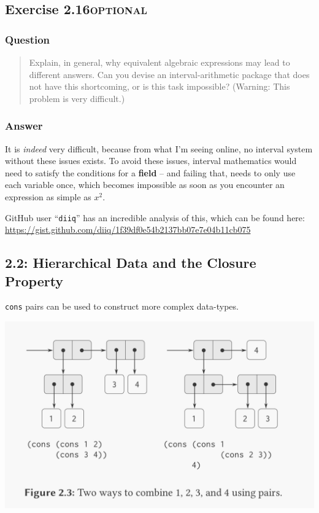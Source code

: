 \documentclass[final,fleqn,titlepage,twoside]{article}
\begin{document}
\subsection{Exercise 2.16\hfill{}\textsc{optional}}
\label{sec:org191cd6a}
\subsubsection{Question}
\label{sec:org5093162}
\begin{quote}
Explain, in general, why equivalent algebraic expressions may lead to different
answers. Can you devise an interval-arithmetic package that does not have this
shortcoming, or is this task impossible? (Warning: This problem is very
difficult.)
\end{quote}

\subsubsection{Answer}
\label{sec:org5db961f}
It is \emph{indeed} very difficult, because from what I'm seeing online, no interval
system without these issues exists. To avoid these issues, interval mathematics
would need to satisfy the conditions for a \textbf{field} -- and failing that, needs to
only use each variable once, which becomes impossible as soon as you encounter
an expression as simple as \(x^2\).

GitHub user ``\texttt{diiq}'' has an incredible analysis of this, which can be found here:
\url{https://gist.github.com/diiq/1f39df0e54b2137bb07e7e04b11cb075}

\subsection{2.2: Hierarchical Data and the Closure Property}
\label{sec:org3f0990f}
\texttt{cons} pairs can be used to construct more complex data-types.

\begin{center}
\includegraphics[width=.9\linewidth]{2/cons-cells.jpeg}
\end{center}
\end{document}

